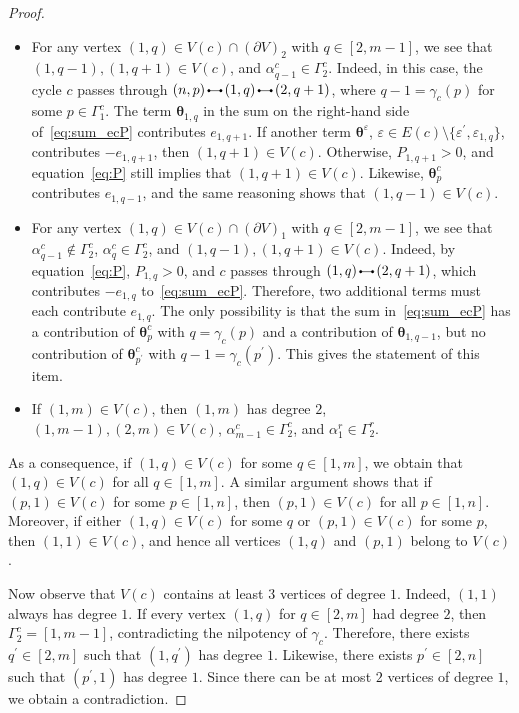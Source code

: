 \documentclass[11pt]{article}
\newcommand{\btheta}{{\boldsymbol{\theta}}}
\theoremstyle{definition}\newtheorem{definition}[theorem]{Definition}
\theoremstyle{definition}\newtheorem{remark}[theorem]{Remark}
\theoremstyle{remark}
\numberwithin{equation}{section}
\newcommand{\edge}{\,
	\begin{tikzpicture}
		\draw (0,.5ex) -- (2ex,.5ex);
		\draw[fill] (0,.5ex) circle (.2ex);
		\draw[fill] (2ex,.5ex) circle (.2ex);
		\draw[fill] (0,0) circle (0);
	\end{tikzpicture}\,
}
\begin{document}
\begin{proof}
\begin{itemize}
        \item For any vertex $(1,q) \in V(c) \cap (\partial V)_2$ with $q \in [2,m-1]$, we see that $(1,q-1),(1,q+1) \in V(c)$, and $\alpha_{q-1}^c \in \Gamma_2^c$. Indeed, in this case, the cycle $c$ passes through $(n,p) \edge (1,q) \edge (2,q+1)$, where $q-1 = \gamma_c(p)$ for some $p \in \Gamma_1^c$. The term $\btheta_{1,q}$ in the sum on the right-hand side of~\eqref{eq:sum_ecP} contributes $e_{1,q+1}$. If another term $\btheta^\varepsilon$, $\varepsilon \in E(c)\setminus\{\varepsilon^\prime,\varepsilon_{1,q}\}$, contributes $-e_{1,q+1}$, then $(1,q+1) \in V(c)$. Otherwise, $P_{1,q+1} > 0$, and equation~\eqref{eq:P} still implies that $(1,q+1) \in V(c)$. Likewise, $\btheta_p^c$ contributes $e_{1,q-1}$, and the same reasoning shows that $(1,q-1) \in V(c)$.
        \item For any vertex $(1,q) \in V(c) \cap (\partial V)_1$ with $q \in [2,m-1]$, we see that $\alpha_{q-1}^c \notin \Gamma_2^c$, $\alpha_q^c \in \Gamma_2^c$, and $(1,q-1),(1,q+1) \in V(c)$. Indeed, by equation~\eqref{eq:P}, $P_{1,q} > 0$,  and $c$ passes through $(1,q) \edge (2,q+1)$, which contributes $-e_{1,q}$ to~\eqref{eq:sum_ecP}. Therefore, two additional terms must each contribute $e_{1,q}$. The only possibility is that the sum in~\eqref{eq:sum_ecP} has a contribution of $\btheta_{p}^c$ with $q =\gamma_c(p)$ and a contribution of $\btheta_{1,q-1}$, but no contribution of $\btheta_{p^\prime}^c$ with $q -1 = \gamma_c(p^\prime)$. This gives the statement of this item.
        \item If $(1,m) \in V(c)$, then $(1,m)$ has degree $2$, $(1,m-1), (2,m) \in V(c)$, $\alpha_{m-1}^c \in \Gamma_2^c$, and $\alpha_1^r \in \Gamma_2^r$.
    \end{itemize}
    As a consequence, if $(1,q) \in V(c)$ for some $q \in [1,m]$, we obtain that $(1,q) \in V(c)$ for all $q \in [1,m]$. A similar argument shows that if $(p,1) \in V(c)$ for some $p \in [1,n]$, then $(p,1) \in V(c)$ for all $p \in [1,n]$. Moreover, if either $(1,q) \in V(c)$ for some $q$ or $(p,1) \in V(c)$ for some $p$, then $(1,1) \in V(c)$, and hence all vertices $(1,q)$ and $(p,1)$ belong to $V(c)$.

    Now observe that $V(c)$ contains at least $3$ vertices of degree $1$. Indeed, $(1,1)$ always has degree $1$. If every vertex $(1,q)$ for $q \in [2,m]$ had degree $2$, then $\Gamma_2^c = [1,m-1]$, contradicting the nilpotency of $\gamma_c$. Therefore, there exists $q^\prime \in [2,m]$ such that $(1,q^\prime)$ has degree $1$. Likewise, there exists $p^\prime \in [2,n]$ such that $(p^\prime,1)$ has degree $1$. Since there can be at most $2$ vertices of degree $1$, we obtain a contradiction.
\end{proof}    
\end{document}
